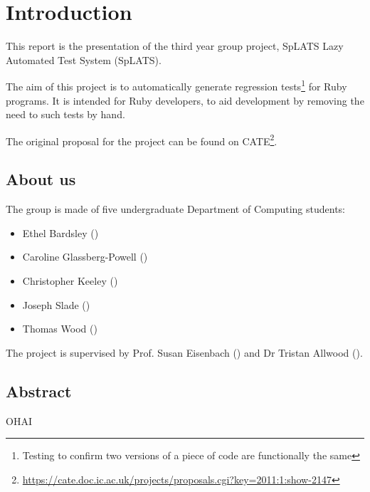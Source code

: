 \chapter{Introduction}

This report is the presentation of the third year group project, SpLATS Lazy Automated Test System (SpLATS).

The aim of this project is to automatically generate regression tests\footnote{Testing to confirm two versions of a piece of code are functionally the same} for Ruby programs.
It is intended for Ruby developers, to aid development by removing the need to such tests by hand.

The original proposal for the project can be found on CATE\footnote{\url{https://cate.doc.ic.ac.uk/projects/proposals.cgi?key=2011:1:show-2147}}.

\section{About us}
  The group is made of five undergraduate Department of Computing students:
  \begin{itemize}
    \item{Ethel Bardsley ()}
    \item{Caroline Glassberg-Powell ()}
    \item{Christopher Keeley ()}
    \item{Joseph Slade ()}
    \item{Thomas Wood ()}
  \end{itemize}

  The project is supervised by Prof. Susan Eisenbach () and Dr Tristan Allwood ().

  
\section{Abstract}

OHAI